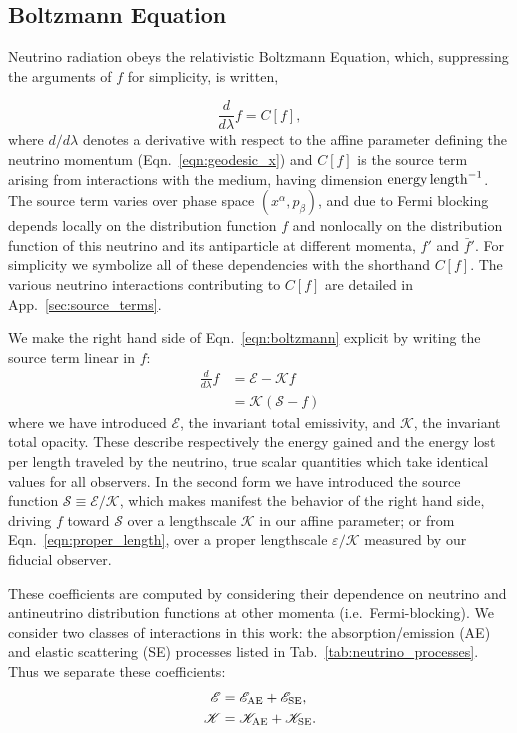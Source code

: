 \documentclass[aps,floatfix,prd,superscriptaddress,twocolumn]{revtex4-1}
\newcommand{\todo}[1]{\marginpar{\tiny{\textcolor{red}{#1}}}}
\renewcommand\todo[1]{} %
\begin{document}
\subsection{Boltzmann Equation}
\label{ssec:boltzmann}
Neutrino radiation obeys the relativistic Boltzmann Equation,
which, suppressing the arguments of $f$ for simplicity, is written,
\todo{point out limit of QKEs}
\begin{equation}
  \label{eqn:boltzmann}
  \frac{d}{d\lambda}f = C[f],
\end{equation}
where $d/d\lambda$ denotes a derivative with respect to the affine
parameter defining the neutrino momentum (Eqn.~\ref{eqn:geodesic_x})
and $C[f]$ is the source term arising from interactions with the medium,
having dimension ${\rm energy}\,{\rm length}^{-1}$.
The source term varies over phase space $(x^\alpha,p_\beta)$,
and due to Fermi blocking depends locally on the distribution function $f$
and nonlocally on the distribution function of this neutrino and its
antiparticle at different momenta, $f'$ and $\bar{f}'$.
For simplicity we symbolize all of these dependencies with the shorthand $C[f]$.
The various neutrino interactions contributing to $C[f]$ are detailed in
App.~\ref{sec:source_terms}.

We make the right hand side of Eqn.~\ref{eqn:boltzmann} explicit by writing
the source term linear in $f$:
\begin{align}
  \label{eqn:boltzmann_linear}
  \frac{d}{d\lambda}f &=
  \mathscr{E} - \mathscr{K} f \\
  \label{eqn:boltzmann_linear_s}
  &= \mathscr{K}(\mathscr{S}-f)
\end{align}
where we have introduced
$\mathscr{E}$, the invariant total emissivity, and
$\mathscr{K}$, the invariant total opacity.
These describe respectively the energy gained and the energy lost
per length traveled by the neutrino, true scalar quantities
which take identical values for all observers.
In the second form we have introduced the source function
$\mathscr{S}\equiv\mathscr{E}/\mathscr{K}$, which makes manifest the
behavior of the right hand side, driving $f$ toward $\mathscr{S}$
over a lengthscale $\mathscr{K}$ in our affine parameter;
or from Eqn.~\ref{eqn:proper_length}, over a proper lengthscale
$\varepsilon/\mathscr{K}$ measured by our fiducial observer.

These coefficients are computed by considering their dependence
on neutrino and antineutrino distribution functions at other momenta
(i.e.\ Fermi-blocking).
We consider two classes of interactions in this work:
the absorption/emission (AE) and elastic scattering (SE) processes
listed in Tab.~\ref{tab:neutrino_processes}.
Thus we separate these coefficients:
\begin{align}
  \label{eqn:inv_emissivity_components}
  \mathscr{E} &= \mathscr{E}_{\rm AE} + \mathscr{E}_{\rm SE},\\
  \label{eqn:inv_opacity_components}
  \mathscr{K} &= \mathscr{K}_{\rm AE} + \mathscr{K}_{\rm SE}.
\end{align}
\end{document}
